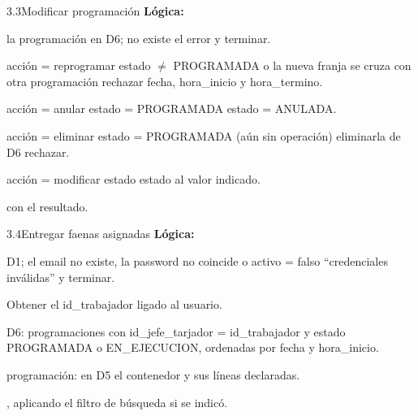 \begin{minispec}{3.3}{Modificar programación}
\textbf{Lógica:}
\begin{logica}
    \item {} la programación en D6;  no existe  el error y
    terminar.
    \item {} acción = reprogramar   estado $\neq$ PROGRAMADA o la
    nueva franja se cruza con otra programación  rechazar 
    fecha, hora\_inicio y hora\_termino.
    \item {} acción = anular   estado = PROGRAMADA  estado = ANULADA.
    \item {} acción = eliminar   estado = PROGRAMADA (aún sin
    operación)  eliminarla de D6  rechazar.
    \item {} acción = modificar estado  estado al valor indicado.
    \item {}  con el resultado.
\end{logica}
\end{minispec}

\begin{minispec}{3.4}{Entregar faenas asignadas}
\textbf{Lógica:}
\begin{logica}
    \item {} D1;  el email no existe, la password no coincide o activo = falso
     ``credenciales inválidas'' y terminar.
    \item Obtener el id\_trabajador ligado al usuario.
    \item {} D6: programaciones con id\_jefe\_tarjador = id\_trabajador y estado
    PROGRAMADA o EN\_EJECUCION, ordenadas por fecha y hora\_inicio.
    \item {} programación:  en D5 el contenedor y sus líneas declaradas.
    \item {} , aplicando el filtro de búsqueda si se indicó.
\end{logica}
\end{minispec}

